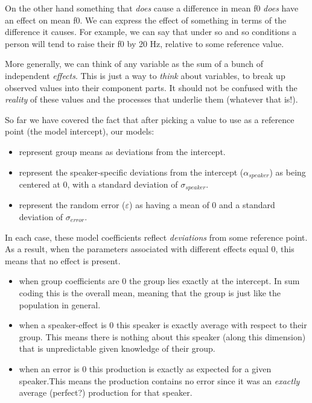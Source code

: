 \documentclass[
]{book}
\begin{document}
On the other hand something that \emph{does} cause a difference in mean f0 \emph{does} have an effect on mean f0. We can express the effect of something in terms of the difference it causes. For example, we can say that under so and so conditions a person will tend to raise their f0 by 20 Hz, relative to some reference value.

More generally, we can think of any variable as the sum of a bunch of independent \emph{effects}. This is just a way to \emph{think} about variables, to break up observed values into their component parts. It should not be confused with the \emph{reality} of these values and the processes that underlie them (whatever that is!).

So far we have covered the fact that after picking a value to use as a reference point (the model intercept), our models:

\begin{itemize}
\item
  represent group means as deviations from the intercept.
\item
  represent the speaker-specific deviations from the intercept (\(\alpha_{speaker}\)) as being centered at 0, with a standard deviation of \(\sigma_{speaker}\).
\item
  represent the random error (\(\varepsilon\)) as having a mean of 0 and a standard deviation of \(\sigma_{error}\).
\end{itemize}

In each case, these model coefficients reflect \emph{deviations} from some reference point. As a result, when the parameters associated with different effects equal 0, this means that no effect is present.

\begin{itemize}
\item
  when group coefficients are 0 the group lies exactly at the intercept. In sum coding this is the overall mean, meaning that the group is just like the population in general.
\item
  when a speaker-effect is 0 this speaker is exactly average with respect to their group. This means there is nothing about this speaker (along this dimension) that is unpredictable given knowledge of their group.
\item
  when an error is 0 this production is exactly as expected for a given speaker.This means the production contains no error since it was an \emph{exactly} average (perfect?) production for that speaker.
\end{itemize}
\end{document}
